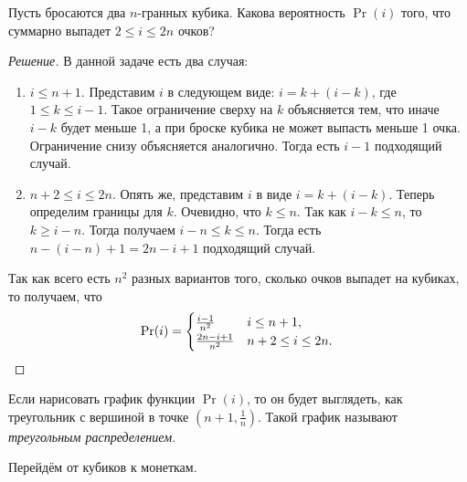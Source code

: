 \begin{problem}
    Пусть бросаются два \(n\)-гранных кубика. Какова вероятность \(\Pr(i)\) того, что суммарно выпадет \(2 \leq i \leq 2n\) очков?
\end{problem}
\begin{proof}[Решение]
    В данной задаче есть два случая:
    \begin{enumerate}
        \item \(i \leq n + 1\). Представим \(i\) в следующем виде: \(i = k + (i - k)\), где \(1 \leq k \leq i - 1\). Такое ограничение сверху на \(k\) объясняется тем, что иначе \(i - k\) будет меньше 1, а при броске кубика не может выпасть меньше 1 очка. Ограничение снизу объясняется аналогично. Тогда есть \(i - 1\) подходящий случай.
        \item \(n + 2 \leq i \leq 2n\). Опять же, представим \(i\) в виде \(i = k + (i - k)\). Теперь определим границы для \(k\). Очевидно, что \(k \leq n\). Так как \(i - k \leq n\), то \(k \geq i - n\). Тогда получаем \(i - n \leq k \leq n\). Тогда есть \(n - (i - n) + 1 = 2n - i + 1\) подходящий случай.
    \end{enumerate}
    Так как всего есть \(n^2\) разных вариантов того, сколько очков выпадет на кубиках, то получаем, что
    \[\Pr(i) = \begin{cases}
    \frac{i - 1}{n^2} & i \leq n + 1, \\
    \frac{2n - i + 1}{n^2} & n + 2 \leq i \leq 2n.
    \end{cases}\qedhere\]
\end{proof}
\begin{remark}
    Если нарисовать график функции \(\Pr(i)\), то он будет выглядеть, как треугольник с вершиной в точке \(\left(n + 1, \frac{1}{n}\right)\). Такой график называют \emph{треугольным распределением}.
\end{remark}

Перейдём от кубиков к монеткам.

